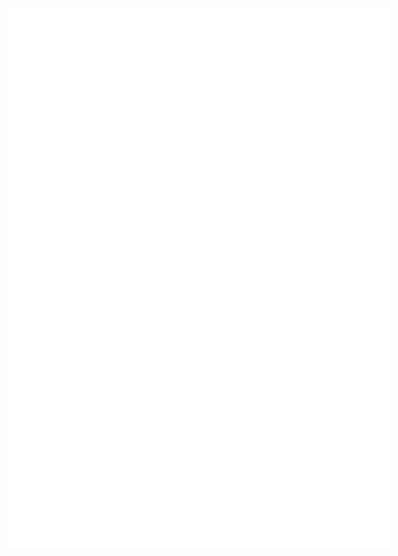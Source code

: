     \begin{figure}
        \centering
        \begin{minipage}{0.75\linewidth}
            \centering
            \includegraphics[width=0.9\textwidth]{figs/hex40_551_0_666}
        \end{minipage}
        \label{fig:forty_hex_comp}
    \end{figure}
